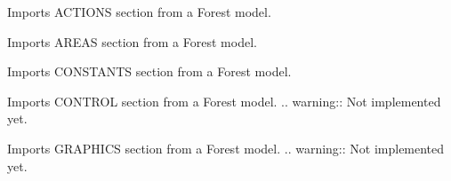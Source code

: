\documentclass[letterpaper,10pt,english]{sphinxmanual}
\begin{document}
\begin{fulllineitems}
\begin{fulllineitems}
\label{\detokenize{forest:forest.ForestModel.import_actions_section}}
Imports ACTIONS section from a Forest model.

\end{fulllineitems}


\begin{fulllineitems}
\label{\detokenize{forest:forest.ForestModel.import_areas_section}}
Imports AREAS section from a Forest model.

\end{fulllineitems}


\begin{fulllineitems}
\label{\detokenize{forest:forest.ForestModel.import_constants_section}}
Imports CONSTANTS section from a Forest model.

\end{fulllineitems}


\begin{fulllineitems}
\label{\detokenize{forest:forest.ForestModel.import_control_section}}
Imports CONTROL section from a Forest model.
.. warning:: Not implemented yet.

\end{fulllineitems}


\begin{fulllineitems}
\label{\detokenize{forest:forest.ForestModel.import_graphics_section}}
Imports GRAPHICS section from a Forest model.
.. warning:: Not implemented yet.


\end{fulllineitems}
\end{fulllineitems}
\end{document}
